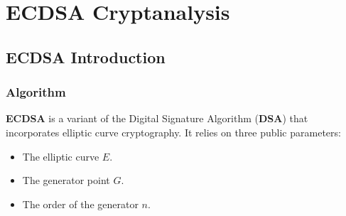 \documentclass[a4paper,12pt]{report}
\newcommand{\Z}{\mathbb{Z}}
\begin{document}
% 
% 
% 

\chapter{ECDSA Cryptanalysis}

\section{ECDSA Introduction}

\subsection{Algorithm}

\textbf{ECDSA} is a variant of the Digital Signature Algorithm (\textbf{DSA}) that incorporates elliptic curve cryptography. It relies on three public parameters:

\begin{itemize}
    \item The elliptic curve \textbf{$E$}.
    \item The generator point \textbf{$G$}.
    \item The order of the generator \textbf{$n$}.
\end{itemize}
\end{document}
